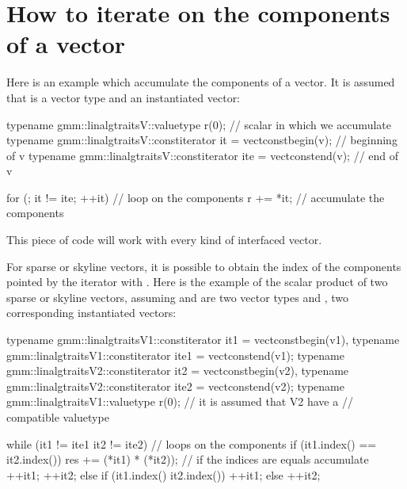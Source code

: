 \documentclass[a4paper,11pt,english]{sphinxmanual}
\begin{document}
\section{How to iterate on the components of a vector}
\label{\detokenize{gmm/inside:how-to-iterate-on-the-components-of-a-vector}}
\sphinxAtStartPar
Here is an example which accumulate the components of a vector. It is assumed that  is a vector type and  an instantiated vector:

\begin{sphinxVerbatim}[commandchars=\\\{\}]
typename gmm::linalg\PYGZus{}traits\PYGZlt{}V\PYGZgt{}::value\PYGZus{}type r(0); // scalar in which we accumulate
typename gmm::linalg\PYGZus{}traits\PYGZlt{}V\PYGZgt{}::const\PYGZus{}iterator it = vect\PYGZus{}const\PYGZus{}begin(v); // beginning of v
typename gmm::linalg\PYGZus{}traits\PYGZlt{}V\PYGZgt{}::const\PYGZus{}iterator ite = vect\PYGZus{}const\PYGZus{}end(v); // end of v

for (; it != ite; ++it)  // loop on the components
  r += *it;              // accumulate the components
\end{sphinxVerbatim}

\sphinxAtStartPar
This piece of code will work with every kind of interfaced vector.

\sphinxAtStartPar
For sparse or skyline vectors, it is possible to obtain the index of the components pointed by the iterator with . Here is the example of the scalar product of two sparse or skyline vectors, assuming  and  are two vector types and ,  two corresponding instantiated vectors:

\begin{sphinxVerbatim}[commandchars=\\\{\}]
typename gmm::linalg\PYGZus{}traits\PYGZlt{}V1\PYGZgt{}::const\PYGZus{}iterator it1 = vect\PYGZus{}const\PYGZus{}begin(v1),
typename gmm::linalg\PYGZus{}traits\PYGZlt{}V1\PYGZgt{}::const\PYGZus{}iterator ite1 = vect\PYGZus{}const\PYGZus{}end(v1);
typename gmm::linalg\PYGZus{}traits\PYGZlt{}V2\PYGZgt{}::const\PYGZus{}iterator it2 = vect\PYGZus{}const\PYGZus{}begin(v2),
typename gmm::linalg\PYGZus{}traits\PYGZlt{}V2\PYGZgt{}::const\PYGZus{}iterator ite2 = vect\PYGZus{}const\PYGZus{}end(v2);
typename gmm::linalg\PYGZus{}traits\PYGZlt{}V1\PYGZgt{}::value\PYGZus{}type r(0); // it is assumed that V2 have a
                                             // compatible value\PYGZus{}type

while (it1 != ite1 \PYGZam{}\PYGZam{} it2 != ite2) \PYGZob{}  // loops on the components
  if (it1.index() == it2.index()) \PYGZob{}
    res += (*it1) * (*it2));          // if the indices are equals accumulate
    ++it1;
    ++it2;
  \PYGZcb{}
  else if (it1.index() \PYGZlt{} it2.index())
    ++it1;
  else
    ++it2;
\PYGZcb{}
\end{sphinxVerbatim}
\end{document}
